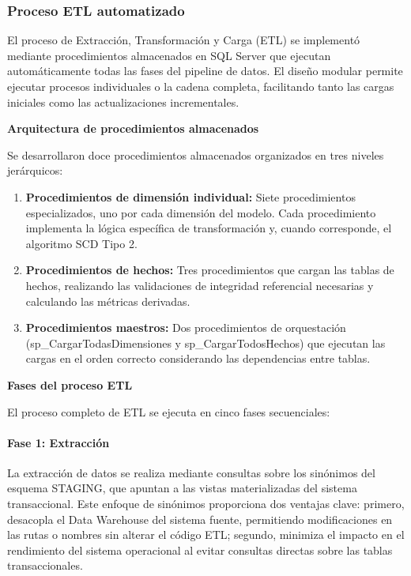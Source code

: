 \subsubsection{Proceso ETL automatizado}

El proceso de Extracción, Transformación y Carga (ETL) se implementó mediante procedimientos almacenados en SQL Server que ejecutan automáticamente todas las fases del pipeline de datos. El diseño modular permite ejecutar procesos individuales o la cadena completa, facilitando tanto las cargas iniciales como las actualizaciones incrementales.

\textbf{Arquitectura de procedimientos almacenados}

Se desarrollaron doce procedimientos almacenados organizados en tres niveles jerárquicos:

\begin{enumerate}
    \item \textbf{Procedimientos de dimensión individual:} Siete procedimientos especializados, uno por cada dimensión del modelo. Cada procedimiento implementa la lógica específica de transformación y, cuando corresponde, el algoritmo SCD Tipo 2.
    
    \item \textbf{Procedimientos de hechos:} Tres procedimientos que cargan las tablas de hechos, realizando las validaciones de integridad referencial necesarias y calculando las métricas derivadas.
    
    \item \textbf{Procedimientos maestros:} Dos procedimientos de orquestación (sp\_CargarTodasDimensiones y sp\_CargarTodosHechos) que ejecutan las cargas en el orden correcto considerando las dependencias entre tablas.
\end{enumerate}

\textbf{Fases del proceso ETL}

El proceso completo de ETL se ejecuta en cinco fases secuenciales:

\paragraph{Fase 1: Extracción}
La extracción de datos se realiza mediante consultas sobre los sinónimos del esquema STAGING, que apuntan a las vistas materializadas del sistema transaccional. Este enfoque de sinónimos proporciona dos ventajas clave: primero, desacopla el Data Warehouse del sistema fuente, permitiendo modificaciones en las rutas o nombres sin alterar el código ETL; segundo, minimiza el impacto en el rendimiento del sistema operacional al evitar consultas directas sobre las tablas transaccionales.

